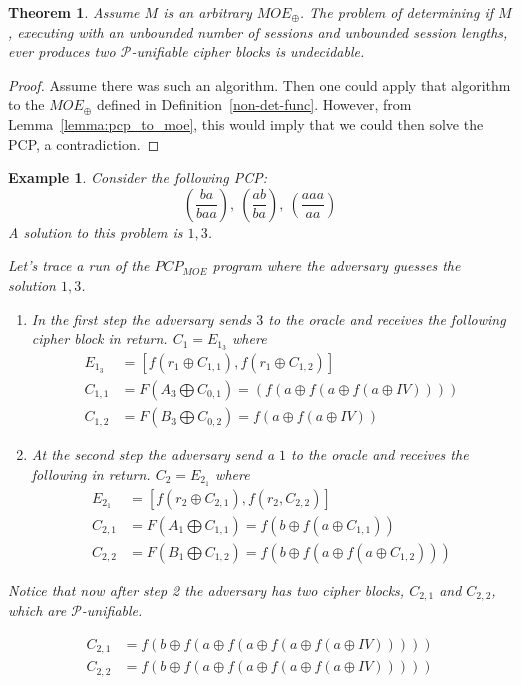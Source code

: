 \documentclass[11pt,twoside,a4paper]{article}
\newtheorem{example}{Example}
\newtheorem{theorem}{Theorem}
\begin{document}
\begin{theorem}
	Assume $M$ is an arbitrary $MOE_{\oplus}$. The problem
	of determining if $M$, executing with 
	an unbounded number of sessions and unbounded session
	lengths, ever produces two  $\mathcal{P}$-unifiable cipher blocks is undecidable. 
\end{theorem}
\begin{proof}
	Assume there was such an algorithm. Then one could apply that
	algorithm to the $MOE_{\oplus}$ defined in
	Definition~\ref{non-det-func}. However, 
	from Lemma~\ref{lemma:pcp_to_moe}, this would
	imply that we could then solve the PCP, a contradiction.   
\end{proof}

\begin{example}
	Consider the following PCP:
	\[
	(\frac{ba}{baa}),~(\frac{ab}{ba}),~(\frac{aaa}{aa})
	\] 
	A solution to this problem is $1,3$. 
	
	Let's trace a run of the $PCP_{MOE}$ program where the 
	adversary guesses the solution $1,3$.
	\begin{enumerate}
		\item In the first step the adversary sends $3$ to the
		oracle and receives the following cipher block in return.
		$C_1 = E_{1_3}$ where
		\begin{align*}
		E_{1_3} &= [f(r_1 \oplus C_{1, 1}), f(r_1 \oplus C_{1,2}) ] \\
		C_{1,1} &= F(A_3 \bigoplus C_{0, 1}) = 
		(f(a \oplus f(a \oplus f(a \oplus IV))))	\\
		C_{1,2} &= F(B_3 \bigoplus C_{0, 2}) =
		f(a \oplus f(a \oplus IV))
		\end{align*}
		\item At the second step the adversary send a $1$ to the
		oracle and receives the following in return.
		$C_2 = E_{2_1}$ where
		\begin{align*}
		E_{2_1} &= [f(r_2 \oplus C_{2, 1}), f(r_2, C_{2,2}) ] \\
		C_{2,1} &= F(A_1 \bigoplus C_{1, 1}) = 
		f(b \oplus f(a \oplus C_{1,1}))	\\
		C_{2,2} &= F(B_1 \bigoplus C_{1, 2}) =
		f(b \oplus f(a \oplus f(a \oplus C_{1,2})))
		\end{align*}
	\end{enumerate}
	Notice that now after step 2 the adversary has two 
	cipher blocks, $C_{2,1}$ and $C_{2,2}$, which are
	$\mathcal{P}$-unifiable.
	
\begin{align*}
C_{2,1} &= f(b \oplus f(a \oplus f(a \oplus f(a \oplus f(a \oplus IV))))) \\
C_{2,2} &= f(b \oplus f(a \oplus f(a \oplus f(a \oplus f(a \oplus IV)))))
\end{align*}

\end{example}
\end{document}
